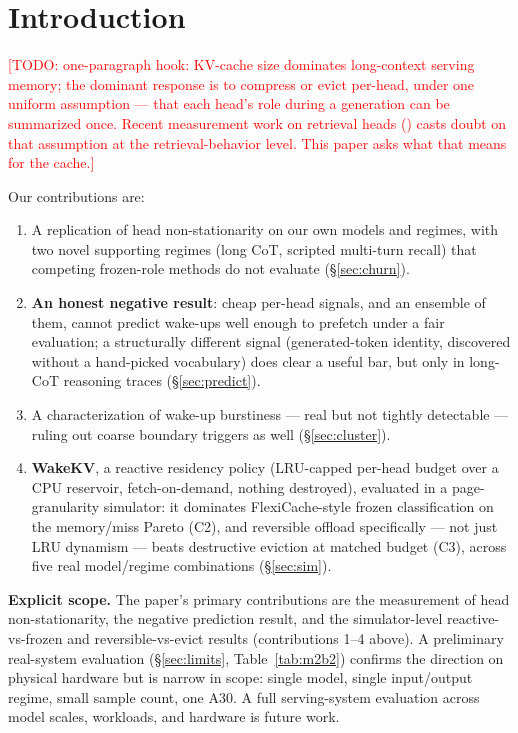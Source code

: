 \documentclass[11pt]{article}
\newcommand{\NEEDPROSE}[1]{\textcolor{red}{[TODO: #1]}}
\begin{document}
\section{Introduction}
\label{sec:intro}

\NEEDPROSE{one-paragraph hook: KV-cache size dominates long-context
serving memory; the dominant response is to compress or evict per-head,
under one uniform assumption --- that each head's role during a
generation can be summarized once. Recent measurement work on retrieval
heads (\cite{retrievalheadsdynamic}) casts doubt on that assumption at
the retrieval-behavior level. This paper asks what that means for the
cache.}

Our contributions are:
\begin{enumerate}
    \item A replication of head non-stationarity on our own models and
        regimes, with two novel supporting regimes (long CoT, scripted
        multi-turn recall) that competing frozen-role methods do not
        evaluate (\S\ref{sec:churn}).
    \item \textbf{An honest negative result}: cheap per-head signals, and
        an ensemble of them, cannot predict wake-ups well enough to
        prefetch under a fair evaluation; a structurally different
        signal (generated-token identity, discovered without a
        hand-picked vocabulary) does clear a useful bar, but only in
        long-CoT reasoning traces (\S\ref{sec:predict}).
    \item A characterization of wake-up burstiness --- real but not
        tightly detectable --- ruling out coarse boundary triggers as
        well (\S\ref{sec:cluster}).
    \item \textbf{WakeKV}, a reactive residency policy (LRU-capped
        per-head budget over a CPU reservoir, fetch-on-demand, nothing
        destroyed), evaluated in a page-granularity simulator: it
        dominates FlexiCache-style frozen classification on the
        memory/miss Pareto (C2), and reversible offload specifically ---
        not just LRU dynamism --- beats destructive eviction at matched
        budget (C3), across five real model/regime combinations
        (\S\ref{sec:sim}).
\end{enumerate}

\textbf{Explicit scope.} The paper's primary contributions are the
measurement of head non-stationarity, the negative prediction result,
and the simulator-level reactive-vs-frozen and reversible-vs-evict
results (contributions 1--4 above). A preliminary real-system evaluation
(\S\ref{sec:limits},
Table~\ref{tab:m2b2}) confirms the direction on physical hardware but
is narrow in scope: single model, single input/output regime, small
sample count, one A30. A full serving-system evaluation across
model scales, workloads, and hardware is future work.
\end{document}
